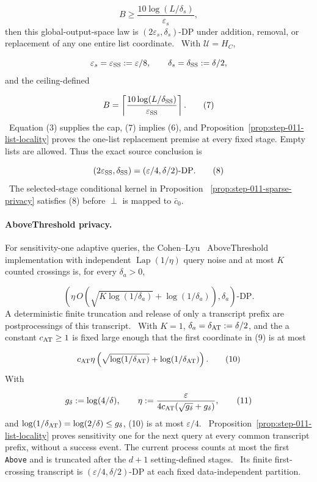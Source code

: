   \[
    B\geq\frac{10\log(L/\delta_s)}{\varepsilon_s},
    \tag{6}
  \]
  then this global-output-space law is
  \((2\varepsilon_s,\delta_s)\)-DP under addition, removal, or replacement
  of any one entire list coordinate.
\noindent \ With \(\mathcal U=H_C\),

  \[
    \varepsilon_s=\varepsilon_{\rm SS}:=\varepsilon/8,
    \qquad \delta_s=\delta_{\rm SS}:=\delta/2,
  \]
  and the  ceiling-defined

  \[
    B=\left\lceil
       \frac{10\log(L/\delta_{\rm SS})}
            {\varepsilon_{\rm SS}}
      \right\rceil.
    \tag{7}
  \]
\noindent \  Equation (3) supplies the cap, (7) implies (6), and
  Proposition~\ref{prop:step-011-list-locality} proves the one-list
  replacement premise at every fixed stage. Empty lists are allowed. Thus
  the exact source conclusion is

  \[
    (2\varepsilon_{\rm SS},\delta_{\rm SS})
    =(\varepsilon/4,\delta/2)\text{-DP}.
    \tag{8}
  \]
\noindent \  The selected-stage conditional kernel in Proposition
  ~\ref{prop:step-011-sparse-privacy} satisfies (8) before \(\perp\) is
  mapped to \(\bar c_0\).

\paragraph{AboveThreshold privacy.}

\noindent For sensitivity-one adaptive
  queries, the Cohen--Lyu~\citep{lyu2025} AboveThreshold implementation with independent
  \(\operatorname{Lap}(1/\eta)\) query noise and at most \(K\) counted
  crossings is, for every \(\delta_a>0\),

  \[
    \left(
      \eta\,O\!\left(
        \sqrt{K\log(1/\delta_a)}+\log(1/\delta_a)
      \right),
      \delta_a
    \right)\text{-DP}.
    \tag{9}
  \]
  A deterministic finite truncation and release of only a transcript prefix
  are postprocessings of this transcript.
\noindent \ With \(K=1\), \(\delta_a=\delta_{\rm AT}:=\delta/2\), and the
  a constant \(c_{\rm AT}\geq1\) is fixed large enough that
  the first coordinate in (9) is at most

  \[
    c_{\rm AT}\eta
    \left(\sqrt{\log(1/\delta_{\rm AT})}
          +\log(1/\delta_{\rm AT})\right).
    \tag{10}
  \]
  With

  \[
    g_\delta:=\log(4/\delta),
    \qquad
    \eta:=\frac{\varepsilon}
      {4c_{\rm AT}(\sqrt{g_\delta}+g_\delta)},
    \tag{11}
  \]
  and
  \(\log(1/\delta_{\rm AT})=\log(2/\delta)\leq g_\delta\), (10) is at most
  \(\varepsilon/4\).
\noindent \  Proposition~\ref{prop:step-011-list-locality}
  proves sensitivity one for the next query at every common transcript
  prefix, without a success event. The current process counts at most the
  first \texttt{Above} and is truncated after the \(d+1\) setting-defined stages.
\noindent \  Its finite first-crossing transcript is
  \((\varepsilon/4,\delta/2)\)-DP at each fixed data-independent partition.

